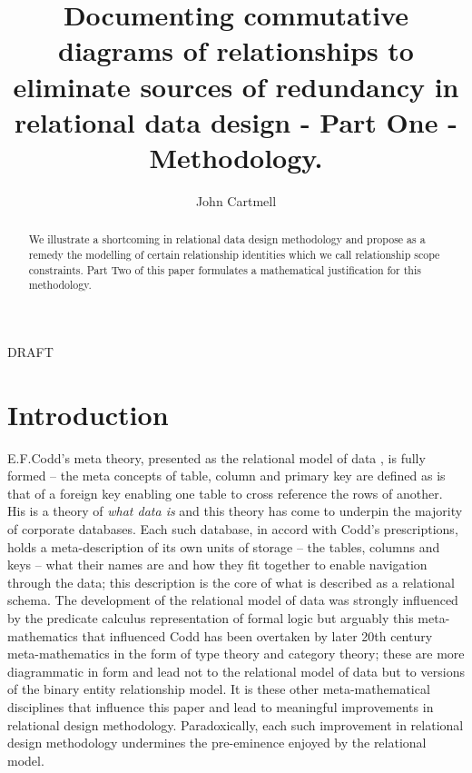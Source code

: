 \documentclass[10pt,a4paper]{article}
\begin{document}
\title{Documenting commutative diagrams of relationships to eliminate sources of redundancy in relational data design - Part One - Methodology.}


\author{John Cartmell}

\maketitle
\begin{center}
DRAFT
\end{center}

\begin{abstract}
\noindent We illustrate a shortcoming in relational data design methodology and propose 
as a remedy the modelling
of certain relationship identities which we call relationship scope constraints.  
Part Two of this paper formulates a mathematical justification for this methodology.
\end{abstract}

% 
\section{Introduction}


E.F.Codd's meta theory, presented as the relational model of data \cite{Codd1970}, is fully formed -- the meta concepts of table, column and primary key are defined as is that of a foreign key enabling one table to cross reference the rows of another. 
His is a theory of \textit{what data is} and this theory has come to underpin the majority of corporate databases.  
Each such database, in accord with Codd's prescriptions, holds a meta-description of its own units of storage -- the tables, columns and keys -- what their names are and how they fit together to enable navigation through the data; this description is the core of what is described as a relational schema. The development of the relational model of data was strongly influenced by the predicate calculus representation of formal logic but arguably 
this meta-mathematics that influenced Codd has been overtaken by  later 20th century meta-mathematics in the form of type theory and category theory; these are more diagrammatic in form and lead not to the relational model of data but to versions of the binary entity relationship model. It is these other meta-mathematical disciplines that influence this paper and lead to meaningful improvements in relational design methodology. Paradoxically, each such improvement in relational design methodology undermines the pre-eminence enjoyed by the relational model.\\
\end{document}
